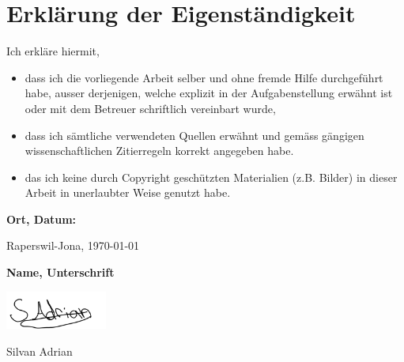 
\chapter*{Erklärung der Eigenständigkeit}

Ich erkläre hiermit,

\begin{itemize}
  \item dass ich die vorliegende Arbeit selber und ohne fremde Hilfe durchgeführt habe, ausser derjenigen, 
  welche explizit in der Aufgabenstellung erwähnt ist oder mit dem Betreuer schriftlich vereinbart wurde,
  \item dass ich sämtliche verwendeten Quellen erwähnt und gemäss gängigen 
  wissenschaftlichen Zitierregeln korrekt angegeben habe.
  \item das ich keine durch Copyright geschützten Materialien (z.B. Bilder) 
  in dieser Arbeit in unerlaubter Weise genutzt habe. 
\end{itemize}

\textbf{Ort, Datum:}

Raperswil-Jona, \today


\textbf{Name, Unterschrift}


\includegraphics[width=0.25\textwidth]{01_Einleitung/images/unterschrift-sadrian}

Silvan Adrian
